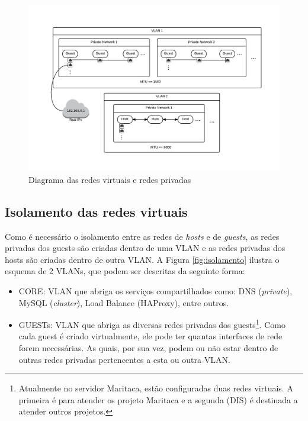     \begin{figure}[htb]
    \centering
    \includegraphics[scale=0.50]{imagens/esquema1.pdf}
    \caption{Diagrama das redes virtuais e redes privadas}
    \label{fig:redesvirtpriv}
    \end{figure}

\subsection{Isolamento das redes virtuais}

Como é necessário o isolamento entre as redes de \textit{hosts} e de \textit{guests}, as redes privadas dos guests são criadas dentro de uma VLAN e as redes privadas dos hosts são criadas dentro de outra VLAN.
A Figura \ref{fig:isolamento} ilustra o esquema de 2 VLANs, que podem ser descritas da seguinte forma:

    \begin{itemize}
        \item CORE: VLAN que abriga os serviços compartilhados como: DNS (\textit{private}), MySQL (\textit{cluster}), Load Balance (HAProxy), entre outros.
        \item GUESTs: VLAN que abriga as diversas redes privadas dos guests\footnote{Atualmente no servidor Maritaca, estão configuradas duas redes virtuais. A primeira é para atender os projeto Maritaca e a segunda (DIS) é destinada a atender outros projetos.}. Como cada guest é criado virtualmente, ele pode ter quantas interfaces de rede forem necessárias. As quais, por sua vez, podem ou não estar dentro de outras redes privadas pertencentes a esta ou outra VLAN.
    \end{itemize}

